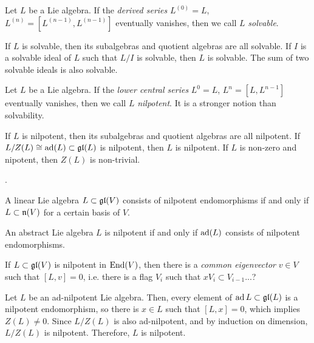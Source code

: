 \documentclass{../../large}
\begin{document}
\begin{prb}
Let $L$ be a Lie algebra.
If the \emph{derived series} $L^{(0)}=L$, $L^{(n)}=[L^{(n-1)},L^{(n-1)}]$ eventually vanishes, then we call $L$ \emph{solvable}.

If $L$ is solvable, then its subalgebras and quotient algebras are all solvable.
If $I$ is a solvable ideal of $L$ such that $L/I$ is solvable, then $L$ is solvable.
The sum of two solvable ideals is also solvable.
\end{prb}

\begin{prb}
Let $L$ be a Lie algebra.
If the \emph{lower central series} $L^0=L$, $L^n=[L,L^{n-1}]$ eventually vanishes, then we call $L$ \emph{nilpotent}.
It is a stronger notion than solvability.

If $L$ is nilpotent, then its subalgebras and quotient algebras are all nilpotent.
If $L/Z(L)\cong\operatorname{ad}(L)\subset\mathfrak{gl}(L)$ is nilpotent, then $L$ is nilpotent.
If $L$ is non-zero and nipotent, then $Z(L)$ is non-trivial.
\end{prb}

\begin{prb}
.
\begin{parts}
\item A linear Lie algebra $L\subset\mathfrak{gl}(V)$ consists of nilpotent endomorphisms if and only if $L\subset\mathfrak{n}(V)$ for a certain basis of $V$.
\item An abstract Lie algebra $L$ is nilpotent if and only if $\operatorname{ad}(L)$ consists of nilpotent endomorphisms.
\item If $L\subset\mathfrak{gl}(V)$ is nilpotent in $\operatorname{End}(V)$, then there is a \emph{common eigenvector} $v\in V$ such that $[L,v]=0$, i.e. there is a flag $V_i$ such that $xV_i\subset V_{i-1}$...?
\end{parts}
\end{prb}
\begin{pf}



Let $L$ be an ad-nilpotent Lie algebra.
Then, every element of $\operatorname{ad} L\subset\mathfrak{gl}(L)$ is a nilpotent endomorphism, so there is $x\in L$ such that $[L,x]=0$, which implies $Z(L)\ne0$.
Since $L/Z(L)$ is also ad-nilpotent, and by induction on dimension, $L/Z(L)$ is nilpotent.
Therefore, $L$ is nilpotent.
\end{pf}
\end{document}
